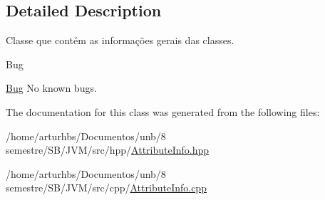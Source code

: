 \subsection{Detailed Description}
Classe que contém as informações gerais das classes. 

\begin{DoxyRefDesc}{Bug}
\item[\hyperlink{bug__bug000006}{Bug}]No known bugs. \end{DoxyRefDesc}


The documentation for this class was generated from the following files\+:\begin{DoxyCompactItemize}
\item 
/home/arturhbs/\+Documentos/unb/8 semestre/\+S\+B/\+J\+V\+M/src/hpp/\hyperlink{AttributeInfo_8hpp}{Attribute\+Info.\+hpp}\item 
/home/arturhbs/\+Documentos/unb/8 semestre/\+S\+B/\+J\+V\+M/src/cpp/\hyperlink{AttributeInfo_8cpp}{Attribute\+Info.\+cpp}\end{DoxyCompactItemize}
